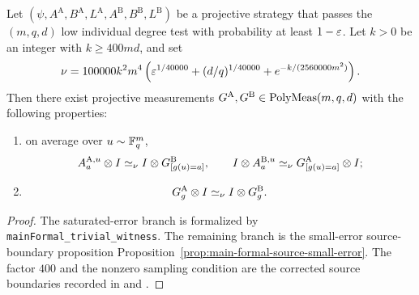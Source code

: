 \begin{theorem}\label{thm:main-formal}
	\leanok
	Let $(\psi, A^{\mathrm A}, B^{\mathrm A}, L^{\mathrm A},
	A^{\mathrm B}, B^{\mathrm B}, L^{\mathrm B})$ be a projective strategy that
	passes the $(m,q,d)$ low individual degree test with probability at least
	$1-\varepsilon$. Let \(k>0\) be an integer with \(k \ge 400md\), and set
	\[
		\nu = 100000 k^2 m^4\left(\varepsilon^{1/40000} + (d/q)^{1/40000} + e^{-k/(2560000m^2)}\right).
	\]
	Then there exist projective measurements
	$G^{\mathrm A}, G^{\mathrm B} \in \mathrm{PolyMeas}(m,q,d)$ with the following
	properties:
	\begin{enumerate}
		\item on average over $u \sim \mathbb{F}_q^m$,
		      \[
			      A_a^{\mathrm A,u} \otimes I \simeq_\nu I \otimes G^{\mathrm B}_{[g(u)=a]},
			      \qquad
			      I \otimes A_a^{\mathrm B,u} \simeq_\nu G^{\mathrm A}_{[g(u)=a]} \otimes I;
		      \]
		\item
		      \[
			      G_g^{\mathrm A} \otimes I \simeq_\nu I \otimes G_g^{\mathrm B}.
		      \]
	\end{enumerate}
\end{theorem}
\begin{proof}
	\leanok
	The saturated-error branch is formalized by
	\texttt{mainFormal\_trivial\_witness}.  The remaining branch is the
	small-error source-boundary proposition
	Proposition~\ref{prop:main-formal-source-small-error}.  The
	factor \(400\) and the nonzero sampling condition are the corrected source
	boundaries recorded in \cite{gap:issue-906-main-formal-k-bound} and
	\cite{gap:issue-422-main-formal-zero-k-boundary}.
\end{proof}

